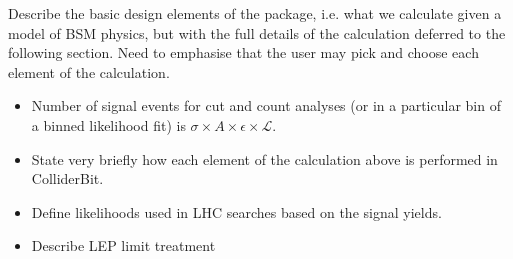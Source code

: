 Describe the basic design elements of the package, i.e. what we calculate given a model of BSM physics, but with the full details of the calculation deferred to the following section. Need to emphasise that the user may pick and choose each element of the calculation.

\begin{itemize}
\item Number of signal events for cut and count analyses (or in a particular bin of a binned likelihood fit) is $\sigma \times A \times \epsilon \times \mathcal{L}$.
\item State very briefly how each element of the calculation above is performed in ColliderBit.
\item Define likelihoods used in LHC searches based on the signal yields.
\item Describe LEP limit treatment
\end{itemize}
